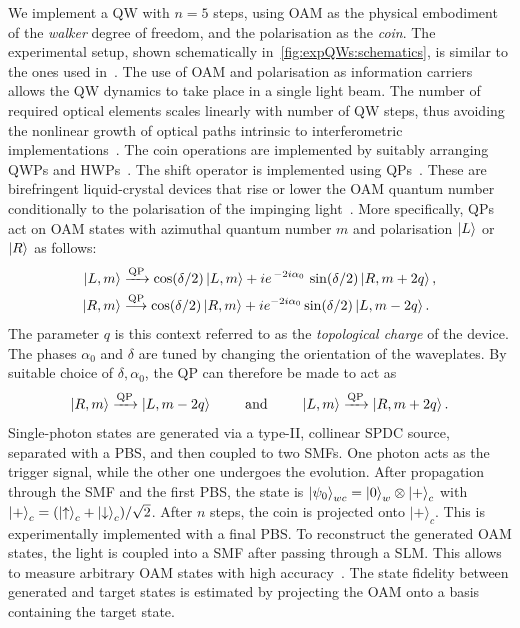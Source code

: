 We implement a \ac{QW} with $n=5$ steps, using \ac{OAM} as the physical embodiment of the \emph{walker} degree of freedom, and the polarisation as the \emph{coin}.
The experimental setup, shown schematically in~\cref{fig:expQWs:schematics}, is similar to the ones used in~\cite{cardano2015quantum,cardano2016statistical}. The use of OAM and polarisation as information carriers allows the QW dynamics to take place in a single light beam.
The number of required optical elements scales linearly with number of QW steps, thus avoiding the nonlinear growth of optical paths intrinsic to interferometric implementations~\cite{zhang2010implementation,goyal2013implementing}.
The coin operations are implemented by suitably arranging \acp{QWP} and \acp{HWP}~\cite{simon1990minimal}. The shift operator is implemented using \acp{QP}~\cite{marrucci2006optical}. These are birefringent liquid-crystal devices that rise or lower the \ac{OAM} quantum number conditionally to the polarisation of the impinging light~\cite{marrucci2006optical}. More specifically, \acp{QP} act on \ac{OAM} states with azimuthal quantum number $m$ and polarisation $\ket L$ or $\ket R$ as follows:
\begin{equation}
\begin{aligned}
	\ket{L,m} & \xrightarrow{\text{QP}} \cos(\delta/2) \ket{L,m}
				+ i e^{\,-2 i \alpha_0}\, \sin(\delta/2) \ket{R,m+2q}, \\
	\ket{R,m} & \stackrel{\text{QP}}{\longrightarrow} \cos(\delta/2) \ket{R,m}
				+ i e^{-2 i \alpha_0} \sin(\delta/2) \ket{L,m-2q}.
\end{aligned}
\end{equation}
The parameter $q$ is this context referred to as the \emph{topological charge} of the device.
The phases $\alpha_0$ and $\delta$ are tuned by changing the orientation of the waveplates. By suitable choice of $\delta,\alpha_0$, the QP can therefore be made to act as
\begin{equation}
	\ket{R,m}\xrightarrow{\text{QP}} \ket{L,m-2q}
	\qquad\text{ and }\qquad
	\ket{L,m}\xrightarrow{\text{QP}}\ket{R,m+2q}.
\end{equation}
Single-photon states are generated via a type-II, collinear \ac{SPDC} source, separated with a \ac{PBS}, and then coupled to two \acp{SMF}. One photon acts as the trigger signal, while the other one undergoes the evolution. After propagation through the \ac{SMF} and the first \ac{PBS}, the state is $\ket{\psi_0}_{wc}=\ket{0}_w \otimes \ket{+}_c$ with $\ket{+}_c=(\ket{{\uparrow}}_c+\ket{{\downarrow}}_c)/\sqrt2$. After $n$ steps, the coin is projected onto $|+\rangle_c$. This is experimentally implemented with a final \ac{PBS}.
To reconstruct the generated \ac{OAM} states, the light is coupled into a \ac{SMF} after passing through a \ac{SLM}. This allows to measure arbitrary \ac{OAM} states with high accuracy~\cite{bolduc2013exact,dambrosio2013test}.
The state fidelity between generated and target states is estimated by projecting the \ac{OAM} onto a basis containing the target state.


